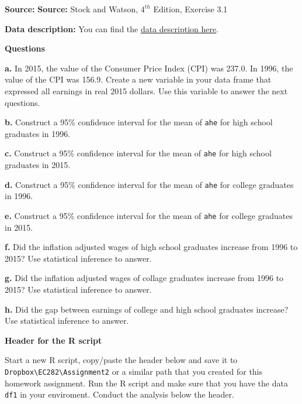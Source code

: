 \documentclass[
]{book}
\begin{document}
\textbf{Source:} \textbf{Source:} Stock and Watson, \(4^{th}\) Edition, Exercise 3.1

\textbf{Data description:} You can find the \href{https://www.dropbox.com/s/7n79v2mjogzxv2j/CPS96_15_Description.pdf?dl=1}{data description here}.

\textbf{Questions}

\textbf{a.} In 2015, the value of the Consumer Price Index (CPI) was 237.0. In 1996, the value of the CPI was 156.9. Create a new variable in your data frame that expressed all earnings in real 2015 dollars. Use this variable to answer the next questions.

\textbf{b.} Construct a 95\% confidence interval for the mean of \texttt{ahe} for high school graduates in 1996.

\textbf{c.} Construct a 95\% confidence interval for the mean of \texttt{ahe} for high school graduates in 2015.

\textbf{d.} Construct a 95\% confidence interval for the mean of \texttt{ahe} for college graduates in 1996.

\textbf{e.} Construct a 95\% confidence interval for the mean of \texttt{ahe} for college graduates in 2015.

\textbf{f.} Did the inflation adjusted wages of high school graduates increase from 1996 to 2015? Use statistical inference to answer.

\textbf{g.} Did the inflation adjusted wages of collage graduates increase from 1996 to 2015? Use statistical inference to answer.

\textbf{h.} Did the gap between earnings of college and high school graduates increase? Use statistical inference to answer.

\textbf{Header for the R script}

Start a new R script, copy/paste the header below and save it to \texttt{Dropbox\textbackslash{}EC282\textbackslash{}Assignment2} or a similar path that you created for this homework assignment. Run the R script and make sure that you have the data \texttt{df1} in your enviroment. Conduct the analysis below the header.
\end{document}
